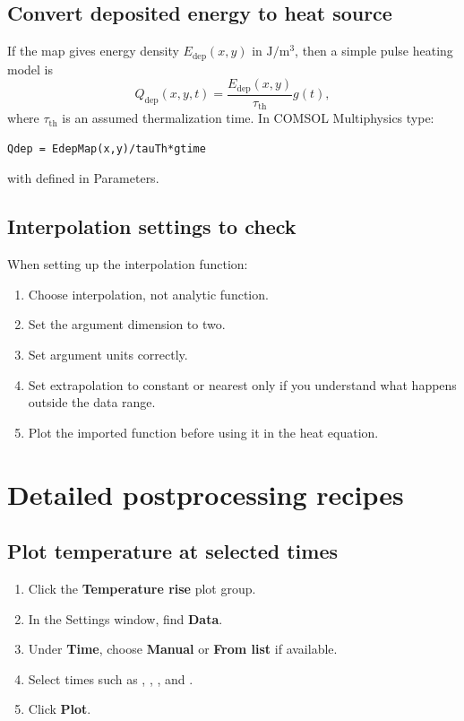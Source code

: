\documentclass[11pt]{article}
\newcommand{\COMSOL}{COMSOL Multiphysics}
\newcommand{\comsol}{\COMSOL}
\newcommand{\type}[1]{\texttt{\detokenize{#1}}}
\newcommand{\menu}[1]{\textbf{#1}}
\begin{document}
\subsection{Convert deposited energy to heat source}
If the map gives energy density \(E_{\mathrm{dep}}(x,y)\) in \(\mathrm{J/m^3}\), then a simple pulse heating model is
\begin{equation}
Q_{\mathrm{dep}}(x,y,t)=\frac{E_{\mathrm{dep}}(x,y)}{\tau_{\mathrm{th}}}g(t),
\end{equation}
where \(\tau_{\mathrm{th}}\) is an assumed thermalization time.  In \comsol{} type:
\begin{lstlisting}
Qdep = EdepMap(x,y)/tauTh*gtime
\end{lstlisting}
with \type{tauTh} defined in Parameters.

\subsection{Interpolation settings to check}
When setting up the interpolation function:
\begin{enumerate}
\item Choose interpolation, not analytic function.
\item Set the argument dimension to two.
\item Set argument units correctly.
\item Set extrapolation to constant or nearest only if you understand what happens outside the data range.
\item Plot the imported function before using it in the heat equation.
\end{enumerate}

\section{Detailed postprocessing recipes}

\subsection{Plot temperature at selected times}
\begin{enumerate}
\item Click the \menu{Temperature rise} plot group.
\item In the Settings window, find \menu{Data}.
\item Under \menu{Time}, choose \menu{Manual} or \menu{From list} if available.
\item Select times such as \type{0}, \type{tpulse}, \type{100[ns]}, and \type{1[us]}.
\item Click \menu{Plot}.
\end{enumerate}
\end{document}
